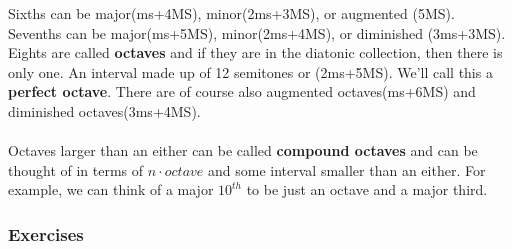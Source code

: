 \documentclass{article}
\begin{document}
Sixths can be major(ms+4MS), minor(2ms+3MS), or augmented (5MS).\\
Sevenths can be major(ms+5MS), minor(2ms+4MS), or diminished (3ms+3MS).\\
Eights are called \textbf{octaves} and if they are in the diatonic collection, then there is only one. An interval made up of 12 semitones or (2ms+5MS). We'll call this a \textbf{perfect octave}. There are of course also augmented octaves(ms+6MS) and diminished octaves(3ms+4MS).\\\\
Octaves larger than an either can be called \textbf{compound octaves} and can be thought of in terms of $n\cdot octave$ and some interval smaller than an either. For example, we can think of a major $10^{th}$ to be just an octave and a major third. 
\subsubsection{Exercises}
\end{document}
